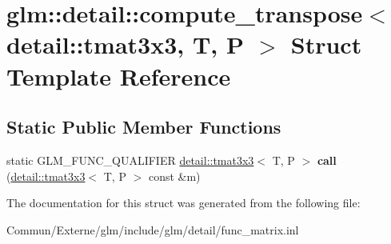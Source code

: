 \hypertarget{structglm_1_1detail_1_1compute__transpose_3_01detail_1_1tmat3x3_00_01_t_00_01_p_01_4}{}\section{glm\+:\+:detail\+:\+:compute\+\_\+transpose$<$ detail\+:\+:tmat3x3, T, P $>$ Struct Template Reference}
\label{structglm_1_1detail_1_1compute__transpose_3_01detail_1_1tmat3x3_00_01_t_00_01_p_01_4}
\subsection*{Static Public Member Functions}
\begin{DoxyCompactItemize}
\item 
static G\+L\+M\+\_\+\+F\+U\+N\+C\+\_\+\+Q\+U\+A\+L\+I\+F\+I\+ER \hyperlink{structglm_1_1detail_1_1tmat3x3}{detail\+::tmat3x3}$<$ T, P $>$ {\bfseries call} (\hyperlink{structglm_1_1detail_1_1tmat3x3}{detail\+::tmat3x3}$<$ T, P $>$ const \&m)\hypertarget{structglm_1_1detail_1_1compute__transpose_3_01detail_1_1tmat3x3_00_01_t_00_01_p_01_4_aeb6e3f561dc927d220808c5267b65149}{}\label{structglm_1_1detail_1_1compute__transpose_3_01detail_1_1tmat3x3_00_01_t_00_01_p_01_4_aeb6e3f561dc927d220808c5267b65149}

\end{DoxyCompactItemize}


The documentation for this struct was generated from the following file\+:\begin{DoxyCompactItemize}
\item 
Commun/\+Externe/glm/include/glm/detail/func\+\_\+matrix.\+inl\end{DoxyCompactItemize}
